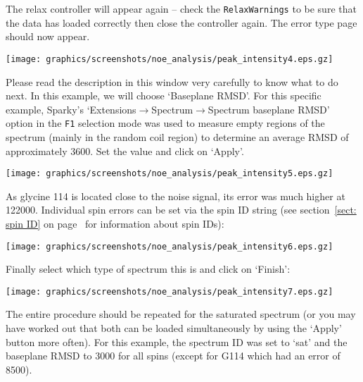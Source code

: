 The relax controller will appear again -- check the \texttt{RelaxWarnings} to be sure that the data has loaded correctly then close the controller again.  The error type page should now appear.

\begin{minipage}[h]{\linewidth}
\centerline{\texttt{[image: graphics/screenshots/noe\_analysis/peak\_intensity4.eps.gz]}}
\end{minipage}

Please read the description in this window very carefully to know what to do next.  In this example, we will choose `Baseplane RMSD'.  For this specific example, Sparky's `Extensions$\to$Spectrum$\to$Spectrum baseplane RMSD' option in the \texttt{F1} selection mode was used to measure empty regions of the spectrum (mainly in the random coil region) to determine an average RMSD of approximately 3600.  Set the value and click on `Apply'.

\begin{minipage}[h]{\linewidth}
\centerline{\texttt{[image: graphics/screenshots/noe\_analysis/peak\_intensity5.eps.gz]}}
\end{minipage}

As glycine 114 is located close to the noise signal, its error was much higher at 122000.  Individual spin errors can be set via the spin ID string (see section~\ref{sect: spin ID} on page~\pageref{sect: spin ID} for information about spin IDs):

\begin{minipage}[h]{\linewidth}
\centerline{\texttt{[image: graphics/screenshots/noe\_analysis/peak\_intensity6.eps.gz]}}
\end{minipage}

Finally select which type of spectrum this is and click on `Finish':

\begin{minipage}[h]{\linewidth}
\centerline{\texttt{[image: graphics/screenshots/noe\_analysis/peak\_intensity7.eps.gz]}}
\end{minipage}

The entire procedure should be repeated for the saturated spectrum (or you may have worked out that both can be loaded simultaneously by using the `Apply' button more often).  For this example, the spectrum ID was set to `sat' and the baseplane RMSD to 3000 for all spins (except for G114 which had an error of 8500).

